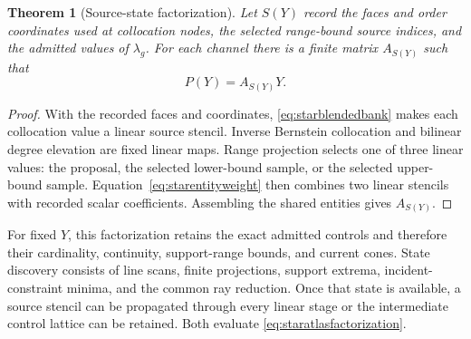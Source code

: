\documentclass[journal]{IEEEtran}
\newtheorem{theorem}{Theorem}
\begin{document}
\begin{theorem}[Source-state factorization]
Let $S(Y)$ record the faces and order coordinates used at collocation nodes,
the selected range-bound source indices, and the admitted values of
$\lambda_g$. For each channel there is a finite matrix $A_{S(Y)}$ such that
\begin{equation}
 P(Y)=A_{S(Y)}Y.
 \label{eq:staratlasfactorization}
\end{equation}
\end{theorem}
\begin{proof}
With the recorded faces and coordinates, \eqref{eq:starblendedbank} makes each
collocation value a linear source stencil. Inverse Bernstein collocation and
bilinear degree elevation are fixed linear maps. Range projection selects
one of three linear values: the proposal, the selected lower-bound sample,
or the selected upper-bound sample. Equation~\eqref{eq:starentityweight}
then combines two linear stencils with recorded scalar coefficients.
Assembling the shared entities gives $A_{S(Y)}$.
\end{proof}

For fixed $Y$, this factorization retains the exact admitted controls and
therefore their cardinality, continuity, support-range bounds, and current
cones. State discovery consists of line scans, finite projections, support
extrema, incident-constraint minima, and the common ray reduction. Once that
state is available, a source stencil can be propagated through every linear
stage or the intermediate control lattice can be retained. Both evaluate
\eqref{eq:staratlasfactorization}.
\end{document}
